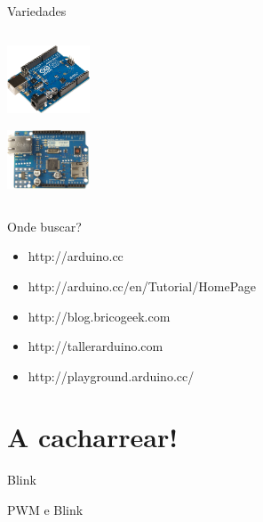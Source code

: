 \documentclass{beamer}
\begin{document}
\begin{frame}{Variedades}
\begin{columns}
\begin{column}{0.75\textwidth}
\begin{columns}
\begin{column}{0.2\textwidth}
\begin{center}
\includegraphics[width=70pt]{./img/Arduino_Uno.png}


\includegraphics[width=70pt]{./img/shield_ethernet.png}
\end{center}
\end{column}
\end{columns}

\end{column}
\end{columns}




\end{frame}

\begin{frame}{Onde buscar?}
\begin{itemize}
	\item http://arduino.cc
	\item http://arduino.cc/en/Tutorial/HomePage
	\item http://blog.bricogeek.com
	\item http://tallerarduino.com
	\item http://playground.arduino.cc/

\end{itemize}
\end{frame}




\section{A cacharrear!}
\begin{frame}
\huge{\centerline{\textbf{\color{blue} \insertsection}}}
\end{frame}



\begin{frame}{Blink}

\end{frame}


\begin{frame}{PWM e Blink}

\end{frame}
\end{document}
